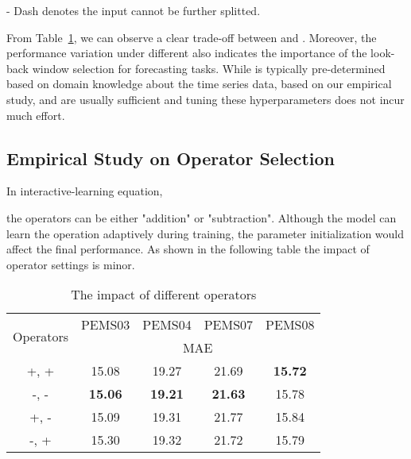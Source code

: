 \documentclass{article}
\begin{document}
\begin{table}[h]
\begin{threeparttable}
\begin{tabular}{c|c|c|c|c|c|c}
\end{tabular}
\begin{tablenotes} \tiny
		\item  - Dash denotes the input cannot be further splitted. 
\end{tablenotes} 

\end{threeparttable} \label{tab:LK}
\end{table}
   


From Table~\ref{tab:LK}, we can observe a clear trade-off between  and . Moreover, the performance variation under different  also indicates the importance of the look-back window selection for forecasting tasks. While  is typically pre-determined based on domain knowledge about the time series data, based on our empirical study,  and  are usually sufficient and tuning these hyperparameters does not incur much effort.  


\subsection{Empirical Study on Operator Selection} \label{appendix:B3}
In interactive-learning equation,
\textbf{}

the operators can be either "addition" or "subtraction". Although the model can learn the operation adaptively during training, the parameter initialization would affect the final performance. As shown in the following table the impact of operator settings is minor.

\begin{table}[h]
\footnotesize
\caption{The impact of different operators}
\centering
\begin{tabular}{c|c|c|c|c}
\hline
\multirow{2}{*}{Operators} & PEMS03            & PEMS04            & PEMS07           & PEMS08           \\ \cline{2-5} 
                           & \multicolumn{4}{c}{MAE}                                          \\ \hline
+, +                       & 15.08 & 19.27 & 21.69 &  \textbf{15.72} \\ \hline
-, -                       & \textbf{15.06} &  \textbf{19.21} &  \textbf{21.63} & 15.78 \\ \hline
+, -                       & 15.09 & 19.31 & 21.77 & 15.84 \\ \hline
-, +                       & 15.30 & 19.32 & 21.72 & 15.79 \\ \hline
\end{tabular}
\label{tab:operator}
\end{table}
\end{document}
